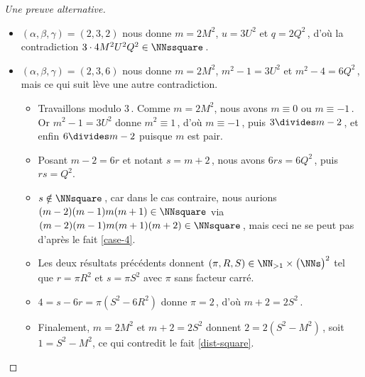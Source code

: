 \begin{proof}[Une preuve alternative]
	\begin{center}
	\end{center}


	\begin{itemize}
		\item $(\alpha, \beta, \gamma) = (2, 3, 2)$ nous donne $m = 2 M^2$, $u = 3 U^2$ et $q = 2 Q^2$\,, d'où la contradiction $3 \cdot4 M^2 U^2 Q^2 \in \NNssquare$\,.


		\item $(\alpha, \beta, \gamma) = (2, 3, 6)$ nous donne $m = 2 M^2$, $m^2 - 1 = 3 U^2$ et $m^2 - 4 = 6 Q^2$\,, mais ce qui suit lève une autre contradiction.
		\begin{itemize}
			\item Travaillons modulo $3$\,.
			Comme $m = 2 M^2$, nous avons $m \equiv 0$ ou $m \equiv -1$\,. 
			Or $m^2 - 1 = 3 U^2$ donne $m^2 \equiv 1$\,, d'où $m \equiv -1$\,, puis $3 \divides m - 2$\,, et enfin $6 \divides m - 2$ puisque $m$ est pair.
			
			\item Posant $m - 2 = 6 r$ et notant $s = m + 2$\,, nous avons $6 r s = 6 Q^2$\,, puis $r s = Q^2$.
			
			\item $s \notin \NNsquare$\,, car dans le cas contraire, nous aurions $(m-2)(m-1)m(m+1) \in \NNsquare$ via $(m-2)(m-1)m(m+1)(m+2)  \in \NNsquare$\,, mais ceci ne se peut pas d'après le fait \ref{case-4}.
			
			\item Les deux résultats précédents donnent $(\pi, R, S) \in \NN_{>1} \times \big( \NNs \big)^2$ tel que $r = \pi R^2$ et $s = \pi S^2$ avec $\pi$ sans facteur carré.
			
			\item $4 = s - 6r = \pi (S^2 - 6 R^2)$ donne $\pi = 2$\,, d'où $m + 2 = 2 S^2$\,.
			
			\item Finalement, $m = 2 M^2$ et $m + 2 = 2 S^2$ donnent $2 = 2(S^2 - M^2)$\,, soit $1 = S^2 - M^2$, ce qui contredit le fait \ref{dist-square}.
			\qedhere
		\end{itemize}
	\end{itemize}
\end{proof}

